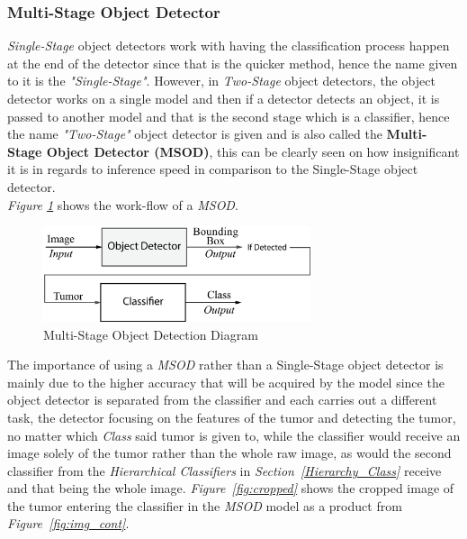 \documentclass[12pt]{extarticle}
\begin{document}
	\subsubsection{Multi-Stage Object Detector}\label{Meth}
	\emph{Single-Stage} object detectors work with having the classification process happen at the end of the detector since that is the quicker method, hence the name given to it is the \emph{"Single-Stage"}. However, in \emph{Two-Stage} object detectors, the object detector works on a single model and then if a detector detects an object, it is passed to another model and that is the second stage which is a classifier, hence the name \emph{"Two-Stage"} object detector is given and is also called the \textbf{Multi-Stage Object Detector (MSOD)}, this can be clearly seen on how insignificant it is in regards to inference speed in comparison to the Single-Stage object detector.\\[5mm]
	\emph{Figure \ref{fig:Multi-Stage Obj Detector}} shows the work-flow of a \emph{MSOD}.\\[5mm]
	\begin{figure}[h]
		\centering
		\includegraphics[width=0.7\textwidth]{pics/Figures/Hierarchical_Obj_Det_Block_Diagram.eps}
		\caption{\small{Multi-Stage Object Detection Diagram}}
		\label{fig:Multi-Stage Obj Detector}
	\end{figure}
	The importance of using a \emph{MSOD} rather than a Single-Stage object detector is mainly due to the higher accuracy that will be acquired by the model since the object detector is separated from the classifier and each carries out a different task, the detector focusing on the features of the tumor and detecting the tumor, no matter which \emph{Class} said tumor is given to, while the classifier would receive an image solely of the tumor rather than the whole raw image, as would the second classifier from the \emph{Hierarchical Classifiers} in \emph{Section~\ref{Hierarchy_Class}} receive and that being the whole image. \emph{Figure~\ref{fig:cropped}} shows the cropped image of the tumor entering the classifier in the \emph{MSOD} model as a product from \emph{Figure~\ref{fig:img_cont}}.
\end{document}

